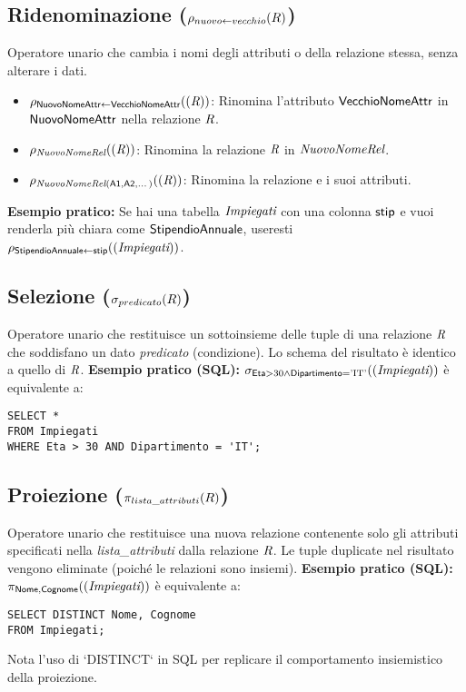	\subsection{Ridenominazione ($\rho_{nuovo \leftarrow vecchio}(R)$)}
	Operatore unario che cambia i nomi degli attributi o della relazione stessa, senza alterare i dati.
	\begin{itemize}
		\item $\rho_{\textsf{NuovoNomeAttr} \leftarrow \textsf{VecchioNomeAttr}}((\textit{R}))$: Rinomina l'attributo $\textsf{VecchioNomeAttr}$ in $\textsf{NuovoNomeAttr}$ nella relazione $\textit{R}$.
		\item $\rho_{\textit{NuovoNomeRel}}((\textit{R}))$: Rinomina la relazione $\textit{R}$ in $\textit{NuovoNomeRel}$.
		\item $\rho_{\textit{NuovoNomeRel}(\textsf{A1}, \textsf{A2}, \dots)}((\textit{R}))$: Rinomina la relazione e i suoi attributi.
	\end{itemize}
	\textbf{Esempio pratico:} Se hai una tabella $\textit{Impiegati}$ con una colonna $\textsf{stip}$ e vuoi renderla più chiara come $\textsf{StipendioAnnuale}$, useresti $\rho_{\textsf{StipendioAnnuale} \leftarrow \textsf{stip}}((\textit{Impiegati}))$.
	
	\subsection{Selezione ($\sigma_{predicato}(R)$)}
	Operatore unario che restituisce un sottoinsieme delle tuple di una relazione $\textit{R}$ che soddisfano un dato \textit{predicato} (condizione).
	Lo schema del risultato è identico a quello di $\textit{R}$.
	\textbf{Esempio pratico (SQL):}
	$\sigma_{\textsf{Eta} > 30 \wedge \textsf{Dipartimento} = \text{'IT'}}((\textit{Impiegati}))$
	è equivalente a:
	\begin{verbatim}
SELECT *
FROM Impiegati
WHERE Eta > 30 AND Dipartimento = 'IT';
	\end{verbatim}
	
	\subsection{Proiezione ($\pi_{lista\_attributi}(R)$)}
	Operatore unario che restituisce una nuova relazione contenente solo gli attributi specificati nella \textit{lista\_attributi} dalla relazione $\textit{R}$.
	Le tuple duplicate nel risultato vengono eliminate (poiché le relazioni sono insiemi).
	\textbf{Esempio pratico (SQL):}
	$\pi_{\textsf{Nome}, \textsf{Cognome}}((\textit{Impiegati}))$
	è equivalente a:
	\begin{verbatim}
SELECT DISTINCT Nome, Cognome
FROM Impiegati;
	\end{verbatim}
	Nota l'uso di `DISTINCT` in SQL per replicare il comportamento insiemistico della proiezione.
	
